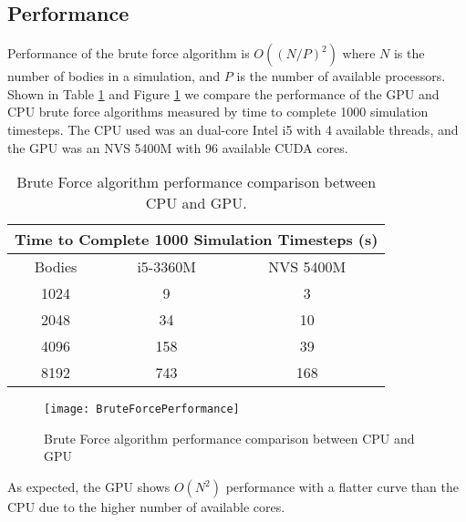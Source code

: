 \documentclass{thesis}
\begin{document}
\subsection{Performance}
Performance of the brute force algorithm is $O\left((N/P)^2\right)$ where $N$ is the number of bodies in a simulation, and $P$ is the number of available processors. Shown in Table \ref{tab:BruteForcePerformance} and Figure \ref{fig:BruteForcePerformance} we compare the performance of the GPU and CPU brute force algorithms measured by time to complete 1000 simulation timesteps. The CPU used was an dual-core Intel i5 with 4 available threads, and the GPU was an NVS 5400M with 96 available CUDA cores.
\begin{table}
    \centering
    \caption{Brute Force algorithm performance comparison between CPU and GPU.}
    \label{tab:BruteForcePerformance}
    \begin{tabular}{|c|||c||c|}
        \hline
        \multicolumn{3}{|c|}{Time to Complete 1000 Simulation Timesteps (s)}\\
        \hline
        Bodies & i5-3360M & NVS 5400M \\
        \hline
        1024 & 9 & 3\\
        2048 & 34 & 10\\
        4096 & 158 & 39\\
        8192 & 743 & 168\\
        \hline
    \end{tabular}
\end{table}
\begin{figure}[t]
    \caption{Brute Force algorithm performance comparison between CPU and GPU}
    \label{fig:BruteForcePerformance}
    \centering
    \texttt{[image: BruteForcePerformance]}
\end{figure}
As expected, the GPU shows $O(N^2)$ performance with a flatter curve than the CPU due to the higher number of available cores.
\end{document}
